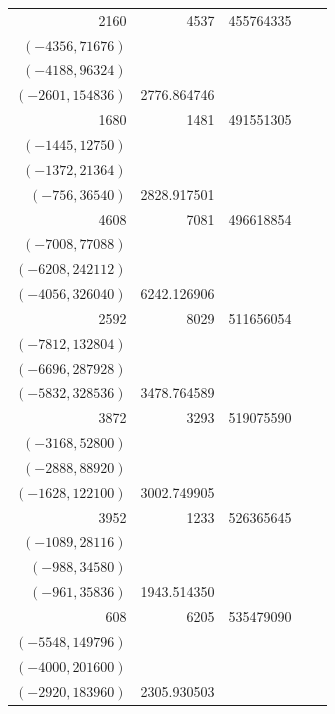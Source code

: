 \documentclass[11pt]{article}
\begin{document}
\begin{longtable}{r r r l r}
2160 & 4537 & 455764335 & \begin{tabular}[t]{@{}l@{}}$(-4500,33300)$\\$(-4356,71676)$\\$(-4188,96324)$\\$(-2601,154836)$\end{tabular} & 2776.864746\\[5pt]
1680 & 1481 & 491551305 & \begin{tabular}[t]{@{}l@{}}$(-1452,11484)$\\$(-1445,12750)$\\$(-1372,21364)$\\$(-756,36540)$\end{tabular} & 2828.917501\\[5pt]
4608 & 7081 & 496618854 & \begin{tabular}[t]{@{}l@{}}$(-7056,45360)$\\$(-7008,77088)$\\$(-6208,242112)$\\$(-4056,326040)$\end{tabular} & 6242.126906\\[5pt]
2592 & 8029 & 511656054 & \begin{tabular}[t]{@{}l@{}}$(-7992,55944)$\\$(-7812,132804)$\\$(-6696,287928)$\\$(-5832,328536)$\end{tabular} & 3478.764589\\[5pt]
3872 & 3293 & 519075590 & \begin{tabular}[t]{@{}l@{}}$(-3256,29304)$\\$(-3168,52800)$\\$(-2888,88920)$\\$(-1628,122100)$\end{tabular} & 3002.749905\\[5pt]
3952 & 1233 & 526365645 & \begin{tabular}[t]{@{}l@{}}$(-1216,10336)$\\$(-1089,28116)$\\$(-988,34580)$\\$(-961,35836)$\end{tabular} & 1943.514350\\[5pt]
608 & 6205 & 535479090 & \begin{tabular}[t]{@{}l@{}}$(-6120,59160)$\\$(-5548,149796)$\\$(-4000,201600)$\\$(-2920,183960)$\end{tabular} & 2305.930503\\[5pt]

\end{longtable}
\end{document}
